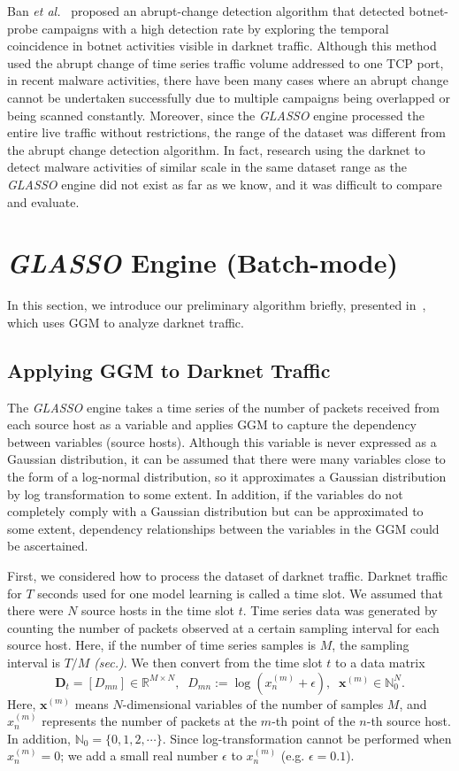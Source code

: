 \documentclass[conference]{IEEEtran}
\begin{document}
Ban {\it et al.}~\cite{Ban} proposed an abrupt-change detection algorithm that detected botnet-probe campaigns with a high detection rate by exploring the temporal coincidence in botnet activities visible in darknet traffic.
Although this method used the abrupt change of time series traffic volume addressed to one TCP port, in recent malware activities, there have been many cases where an abrupt change cannot be undertaken successfully due to multiple campaigns being overlapped or being scanned constantly.
Moreover, since the {\it GLASSO} engine processed the entire live traffic without restrictions, the range of the dataset was different from the abrupt change detection algorithm.
In fact, research using the darknet to detect malware activities of similar scale in the same dataset range as the {\it GLASSO} engine did not exist as far as we know, and it was difficult to compare and evaluate.




\section{{\it GLASSO} Engine (Batch-mode)}
In this section, we introduce our preliminary algorithm briefly, presented in~\cite{Han}, which uses GGM to analyze darknet traffic.


\subsection{Applying GGM to Darknet Traffic}
The {\it GLASSO} engine takes a time series of the number of packets received from each source host as a variable and applies GGM to capture the dependency between variables (source hosts).
Although this variable is never expressed as a Gaussian distribution, it can be assumed that there were many variables close to the form of a log-normal distribution, so it approximates a Gaussian distribution by log transformation to some extent.
In addition, if the variables do not completely comply with a Gaussian distribution but can be approximated to some extent, dependency relationships between the variables in the GGM could be ascertained.

First, we considered how to process the dataset of darknet traffic.
Darknet traffic for $T$ seconds used for one model learning is called a time slot.
We assumed that there were $N$ source hosts in the time slot $t$.
Time series data was generated by counting the number of packets observed at a certain sampling interval for each source host.
Here, if the number of time series samples is $M$, the sampling interval is $T/M$ {\it (sec.)}.
We then convert from the time slot $t$ to a data matrix
\begin{equation*}
\bm{D}_t=[D_{mn}]\in\mathbb{R}^{M \times N},
\;\;D_{mn} := \log(x_n^{(m)}+\epsilon),
\;\;\bm{x}^{(m)}\in\mathbb{N}_0^{N}.
\end{equation*}
Here, $\bm{x}^{(m)}$ means $N$-dimensional variables of the number of samples $M$, and $x_n^{(m)}$ represents the number of packets at the $m$-th point of the $n$-th source host.
In addition, $\mathbb{N}_0=\{0,1,2,\cdots\}$.
Since log-transformation cannot be performed when $x_n^{(m)}=0$; we add a small real number $\epsilon$ to $x_n^{(m)}$ (e.g. $\epsilon=0.1$).
\end{document}
